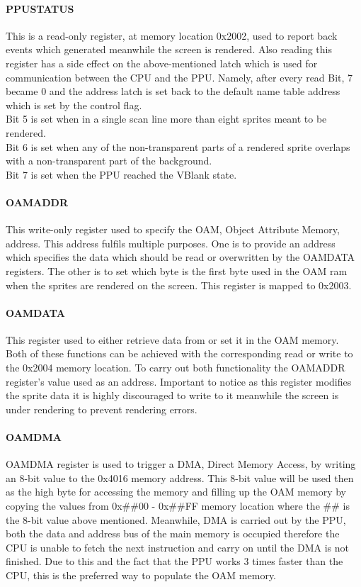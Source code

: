\documentclass[]{report}
\begin{document}
\paragraph{PPUSTATUS}
This is a read-only register, at memory location 0x2002, used to report back events which generated meanwhile the screen is rendered. Also reading this register has a side effect on the above-mentioned latch which is used for communication between the CPU and the PPU. Namely, after every read Bit, 7 became 0 and the address latch is set back to the default name table address which is set by the control flag.
\\
Bit 5 is set when in a single scan line more than eight sprites meant to be rendered.
\\
Bit 6 is set when any of the non-transparent parts of a rendered sprite overlaps with a non-transparent part of the background.
\\
Bit 7 is set when the PPU reached the VBlank state.

\paragraph{OAMADDR}
This write-only register used to specify the OAM, Object Attribute Memory, address. This address fulfils multiple purposes. One is to provide an address which specifies the data which should be read or overwritten by the OAMDATA registers. The other is to set which byte is the first byte used in the OAM ram when the sprites are rendered on the screen. This register is mapped to 0x2003.

\paragraph{OAMDATA}
This register used to either retrieve data from or set it in the OAM memory. Both of these functions can be achieved with the corresponding read or write to the 0x2004 memory location. To carry out both functionality the OAMADDR register's value used as an address. Important to notice as this register modifies the sprite data it is highly discouraged to write to it meanwhile the screen is under rendering to prevent rendering errors.

\paragraph{OAMDMA}
OAMDMA register is used to trigger a DMA, Direct Memory Access, by writing an 8-bit value to the 0x4016 memory address. This 8-bit value will be used then as the high byte for accessing the memory and filling up the OAM memory by copying the values from 0x\#\#00 - 0x\#\#FF memory location where the \#\# is the 8-bit value above mentioned. Meanwhile, DMA is carried out by the PPU, both the data and address bus of the main memory is occupied therefore the CPU is unable to fetch the next instruction and carry on until the DMA is not finished. Due to this and the fact that the PPU works 3 times faster than the CPU, this is the preferred way to populate the OAM memory.
\end{document}
